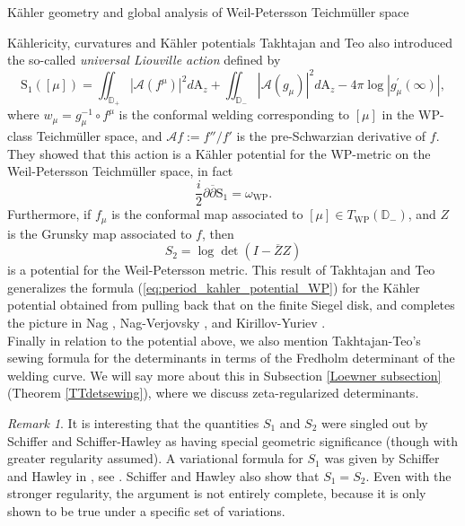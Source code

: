 \documentclass[12pt]{amsart}
\newcommand{\disk}{\ensuremath{\mathbb{D}} } %
\theoremstyle{plain}
\theoremstyle{definition}
\theoremstyle{remark}
\newtheorem{remark}[theorem]{Remark}
\numberwithin{equation}{section} %
\numberwithin{figure}{section} %
\begin{document}
\begin{section}{K\"ahler geometry and global analysis of Weil-Petersson Teichm\"uller space}
\begin{subsection}{K\"ahlericity, curvatures and K\"ahler potentials}
Takhtajan and Teo \cite{Takhtajan_Teo_Memoirs} also introduced the so-called \emph{universal Liouville action} defined by
\begin{equation}\label{Liouville}
\mathrm{S}_{1}([\mu])=\iint_{\mathbb{D}_+}\left|\mathcal{A}\left({f}^{\mu}\right)\right|^{2} d \mathrm{A}_z+\iint_{\mathbb{D}_{-}}\left|\mathcal{A}\left({g}_{\mu}\right)\right|^{2} d\mathrm{A}_z -4 \pi \log \left|{g}_{\mu}^{\prime}(\infty)\right|,
\end{equation}
where \(w_{\mu}={g}_{\mu}^{-1} \circ {f}^{\mu}\) is the conformal welding corresponding to \([\mu]\) in the WP-class Teichm\"uller space, and $\mathcal{A} f:=f''/f'$ is the pre-Schwarzian derivative of $f$.
They showed that this action is a Kähler potential for the WP-metric
on the Weil-Petersson Teichmüller space, in fact
\begin{equation}
    \frac{i}{2}\partial \overline{\partial} \mathrm{S}_{1}=  \omega_{\mathrm{W P}}.
\end{equation}
Furthermore, if $f_\mu$ is the conformal map associated to $[\mu] \in T_{\mathrm{WP}}(\disk_-)$, and $Z$ is the Grunsky map associated to $f$, then 
\begin{equation} \label{eq:Kahler_potential_Grunsky}
 S_2 = \log \det (I - \overline{Z} Z)  
\end{equation}
is a potential for the Weil-Petersson metric. This result of Takhtajan and Teo generalizes the formula (\ref{eq:period_kahler_potential_WP}) for the K\"ahler potential obtained from pulling back that on the finite Siegel disk, and completes the picture in Nag \cite{Nag_bulletin}, Nag-Verjovsky \cite{NagVerjovsky}, and Kirillov-Yuriev \cite{KY2}.\\

{Finally in relation to the potential above, we also mention Takhtajan-Teo's sewing formula for the determinants in terms of the Fredholm determinant of the welding curve. We will say more about this in Subsection \ref{Loewner subsection} (Theorem \ref{TTdetsewing}), where we discuss zeta-regularized determinants.}\\

{
\begin{remark}
 It is interesting that the quantities $S_1$ \cite{Schifferplane,Schiffer_multiply,Schiffer_rend_Fredholm,Schiffer_Pol} and $S_2$ \cite{Schiffer_Hawley_connections} were singled out by Schiffer and Schiffer-Hawley as having special geometric significance (though with greater regularity assumed). A variational formula for $S_1$ was given by Schiffer and Hawley in \cite{Schiffer_Hawley_connections}, see \cite[Remark 3.11]{Takhtajan_Teo_Memoirs}. Schiffer and Hawley also show that $S_1=S_2$. Even with the stronger regularity, the argument is not entirely complete, because it is only shown to be true under a specific set of variations.  


\end{remark}}
\end{subsection}
\end{section}
\end{document}
